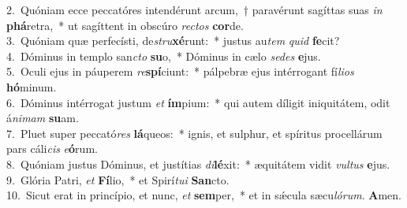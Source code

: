 {2.~}Quóniam ecce peccatóres intendérunt arcum,~† paravérunt sagíttas suas \textit{in} \textbf{phá}retra,~* ut sagíttent in obscúro \textit{re}\textit{ctos} \textbf{cor}de.\\
{3.~}Quóniam quæ perfecísti, de\textit{stru}\textbf{xé}runt:~* justus au\textit{tem} \textit{quid} \textbf{fe}cit?\\
{4.~}Dóminus in templo san\textit{cto} \textbf{su}o,~* Dóminus in cælo \textit{se}\textit{des} \textbf{e}jus.\\
{5.~}Oculi ejus in páuperem \textit{re}\textbf{spí}ciunt:~* pálpebræ ejus intérrogant fí\textit{li}\textit{os} \textbf{hó}minum.\\
{6.~}Dóminus intérrogat justum \textit{et} \textbf{ím}pium:~* qui autem díligit iniquitátem, odit á\textit{ni}\textit{mam} \textbf{su}am.\\
{7.~}Pluet super peccató\textit{res} \textbf{lá}queos:~* ignis, et sulphur, et spíritus procellárum pars cáli\textit{cis} \textit{e}\textbf{ó}rum.\\
{8.~}Quóniam justus Dóminus, et justítias \textit{di}\textbf{lé}xit:~* æquitátem vidit \textit{vul}\textit{tus} \textbf{e}jus.\\
{9.~}Glória Patri, \textit{et} \textbf{Fí}lio,~* et Spirí\textit{tu}\textit{i} \textbf{San}cto.\\
{10.~}Sicut erat in princípio, et nunc, \textit{et} \textbf{sem}per,~* et in sǽcula sæcu\textit{ló}\textit{rum}. \textbf{A}men.\\
